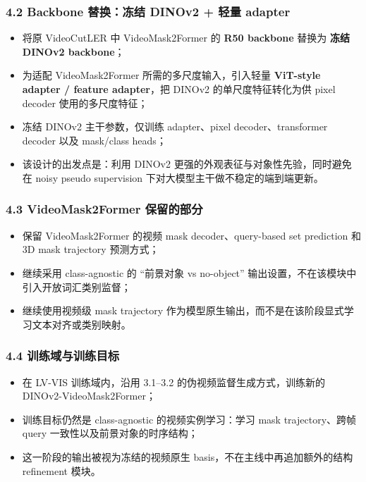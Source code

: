 \documentclass[UTF8]{ctexart}
\begin{document}
\subsubsection*{4.2 Backbone 替换：冻结 DINOv2 + 轻量 adapter}
\begin{itemize}
\item 将原 VideoCutLER 中 VideoMask2Former 的 \textbf{R50 backbone} 替换为 \textbf{冻结 DINOv2 backbone}；
\item 为适配 VideoMask2Former 所需的多尺度输入，引入轻量 \textbf{ViT-style adapter / feature adapter}，把 DINOv2 的单尺度特征转化为供 pixel decoder 使用的多尺度特征；
\item 冻结 DINOv2 主干参数，仅训练 adapter、pixel decoder、transformer decoder 以及 mask/class heads；
\item 该设计的出发点是：利用 DINOv2 更强的外观表征与对象性先验，同时避免在 noisy pseudo supervision 下对大模型主干做不稳定的端到端更新。
\end{itemize}

\subsubsection*{4.3 VideoMask2Former 保留的部分}
\begin{itemize}
\item 保留 VideoMask2Former 的视频 mask decoder、query-based set prediction 和 3D mask trajectory 预测方式；
\item 继续采用 class-agnostic 的 ``前景对象 vs no-object'' 输出设置，不在该模块中引入开放词汇类别监督；
\item 继续使用视频级 mask trajectory 作为模型原生输出，而不是在该阶段显式学习文本对齐或类别映射。
\end{itemize}

\subsubsection*{4.4 训练域与训练目标}
\begin{itemize}
\item 在 LV-VIS 训练域内，沿用 3.1--3.2 的伪视频监督生成方式，训练新的 DINOv2-VideoMask2Former；
\item 训练目标仍然是 class-agnostic 的视频实例学习：学习 mask trajectory、跨帧 query 一致性以及前景对象的时序结构；
\item 这一阶段的输出被视为冻结的视频原生 basis，不在主线中再追加额外的结构 refinement 模块。
\end{itemize}
\end{document}
